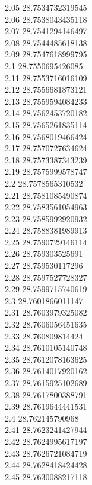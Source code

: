 {2.05	28.7534732319545\\
2.06	28.7538043435118\\
2.07	28.7541294146497\\
2.08	28.7544485618138\\
2.09	28.7547618999795\\
2.1	28.7550695426085\\
2.11	28.7553716016109\\
2.12	28.7556681873121\\
2.13	28.7559594084233\\
2.14	28.7562453720182\\
2.15	28.7565261835114\\
2.16	28.7568019466424\\
2.17	28.7570727634624\\
2.18	28.7573387343239\\
2.19	28.7575999578747\\
2.2	28.7578565310532\\
2.21	28.7581085490874\\
2.22	28.7583561054963\\
2.23	28.7585992920932\\
2.24	28.7588381989913\\
2.25	28.7590729146114\\
2.26	28.759303525691\\
2.27	28.759530117296\\
2.28	28.7597527728327\\
2.29	28.7599715740619\\
2.3	28.7601866011147\\
2.31	28.7603979325082\\
2.32	28.7606056451635\\
2.33	28.760809814424\\
2.34	28.7610105140748\\
2.35	28.7612078163625\\
2.36	28.7614017920162\\
2.37	28.7615925102689\\
2.38	28.7617800388791\\
2.39	28.7619644441531\\
2.4	28.762145790968\\
2.41	28.7623241427944\\
2.42	28.7624995617197\\
2.43	28.7626721084719\\
2.44	28.7628418424428\\
2.45	28.7630088217118\\
}
